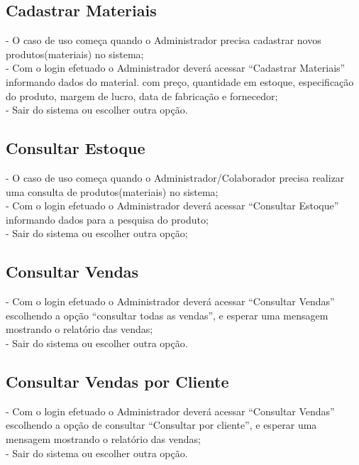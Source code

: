 \documentclass[a4paper]{article}
\begin{document}
  \subsection{Cadastrar Materiais}
    - O caso de uso começa quando o Administrador precisa cadastrar novos
    produtos(materiais) no sistema;\\
    - Com o login efetuado o Administrador deverá acessar “Cadastrar Materiais”
    informando dados do material.  com preço, quantidade em estoque, especificação
    do produto, margem de lucro, data de fabricação e fornecedor;\\
    - Sair do sistema ou escolher outra opção.\\
  
   \subsection{Consultar Estoque}
    - O caso de uso começa quando o Administrador/Colaborador precisa realizar uma
    consulta de produtos(materiais) no sistema;\\
    - Com o login efetuado o Administrador deverá acessar “Consultar Estoque”
    informando dados para a pesquisa do produto;\\
    - Sair do sistema ou escolher outra opção;\\
    
  \subsection{Consultar Vendas}
  - Com o login efetuado o Administrador deverá acessar “Consultar Vendas” escolhendo
  a opção “consultar todas as vendas”, e esperar uma mensagem mostrando o relatório das vendas;\\
  - Sair do sistema ou escolher outra opção.\\
  

  \subsection{Consultar Vendas por Cliente}
  - Com o login efetuado o Administrador deverá acessar “Consultar Vendas”
  escolhendo a opção de consultar “Consultar por cliente”, e esperar uma mensagem 
  mostrando o relatório das vendas;\\
  - Sair do sistema ou escolher outra opção.\\
  
  
\end{document}
